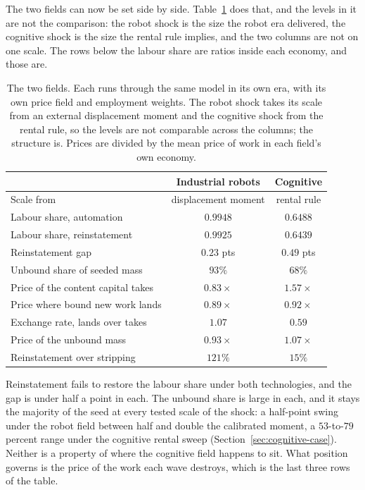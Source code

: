 \documentclass[12pt, a4paper]{article}
\begin{document}
The two fields can now be set side by side. Table~\ref{tab:two-fields}
does that, and the levels in it are not the comparison: the robot shock is
the size the robot era delivered, the cognitive shock is the size the
rental rule implies, and the two columns are not on one scale. The rows
below the labour share are ratios inside each economy, and those are.

\begin{table}[!htbp]
\centering
\caption{The two fields. Each runs through the same model in its own
era, with its own price field and employment weights. The robot shock
takes its scale from an external displacement moment and the cognitive
shock from the rental rule, so the levels are not comparable across the
columns; the structure is. Prices are divided by the mean price of work
in each field's own economy.}
\label{tab:two-fields}
\begin{tabular}{lcc}
\toprule
 & Industrial robots & Cognitive \\
\midrule
Scale from & displacement moment & rental rule \\
Labour share, automation & $0.9948$ & $0.6488$ \\
Labour share, reinstatement & $0.9925$ & $0.6439$ \\
Reinstatement gap & $0.23$ pts & $0.49$ pts \\
Unbound share of seeded mass & $93\%$ & $68\%$ \\
\midrule
Price of the content capital takes & $0.83\times$ & $1.57\times$ \\
Price where bound new work lands & $0.89\times$ & $0.92\times$ \\
Exchange rate, lands over takes & $1.07$ & $0.59$ \\
Price of the unbound mass & $0.93\times$ & $1.07\times$ \\
Reinstatement over stripping & $121\%$ & $15\%$ \\
\bottomrule
\end{tabular}
\end{table}

Reinstatement fails to restore the labour share under both technologies,
and the gap is under half a point in each. The unbound share is large in
each, and it stays the majority of the seed at every tested scale of the
shock: a half-point swing under the robot field between half and double
the calibrated moment, a $53$-to-$79$ percent range under the cognitive
rental sweep (Section~\ref{sec:cognitive-case}). Neither is a property
of where the cognitive field happens to sit. What position governs is
the price of the work each wave destroys, which is the last three rows
of the table.
\end{document}

